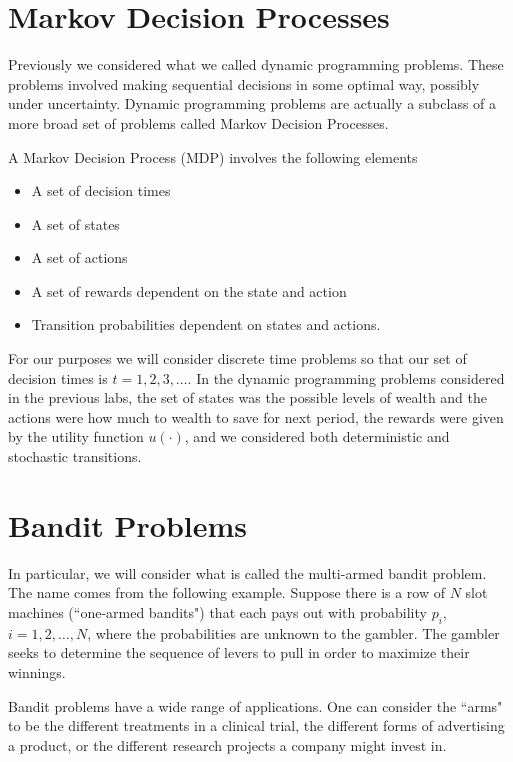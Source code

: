 
\section*{Markov Decision Processes}
Previously we considered what we called dynamic programming problems.  These problems involved making sequential decisions in some optimal way, possibly under uncertainty.  Dynamic programming problems are actually a subclass of a more broad set of problems called Markov Decision Processes.

A Markov Decision Process (MDP) involves the following elements

\begin{itemize}
\item   A set of decision times
\item   A set of states
\item   A set of actions
\item   A set of rewards dependent on the state and action
\item   Transition probabilities dependent on states and actions.
\end{itemize}

For our purposes we will consider discrete time problems so that our set of decision times is $t = 1,2,3,\ldots$.  In the dynamic programming problems considered in the previous labs, the set of states was the possible levels of wealth and the actions were how much to wealth to save for next period, the rewards were given by the utility function $u(\cdot)$, and we considered both deterministic and stochastic transitions.

\section*{Bandit Problems}
In particular, we will consider what is called the multi-armed bandit problem.  The name comes from the following example.  Suppose there is a row of $N$ slot machines (``one-armed bandits") that each pays out with probability $p_i$, $i= 1,2,\ldots,N$, where the probabilities are unknown to the gambler.  The gambler seeks to determine the sequence of levers to pull in order to maximize their winnings.

Bandit problems have a wide range of applications.  One can consider the ``arms" to be the different treatments in a clinical trial, the different forms of advertising a product, or the different research projects a company might invest in.

